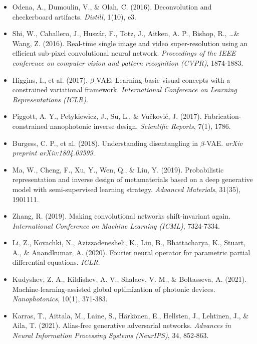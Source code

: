 \begin{itemize}
  \item[{[21]}] Odena, A., Dumoulin, V., \& Olah, C. (2016). Deconvolution and checkerboard artifacts. \textit{Distill}, 1(10), e3.
  \item[{[22]}] Shi, W., Caballero, J., Husz\'{a}r, F., Totz, J., Aitken, A. P., Bishop, R., \ldots \& Wang, Z. (2016). Real-time single image and video super-resolution using an efficient sub-pixel convolutional neural network. \textit{Proceedings of the IEEE conference on computer vision and pattern recognition (CVPR)}, 1874-1883.
  \item[{[23]}] Higgins, I., et al. (2017). $\beta$-VAE: Learning basic visual concepts with a constrained variational framework. \textit{International Conference on Learning Representations (ICLR)}.
  \item[{[24]}] Piggott, A. Y., Petykiewicz, J., Su, L., \& Vu\v{c}kovi\'{c}, J. (2017). Fabrication-constrained nanophotonic inverse design. \textit{Scientific Reports}, 7(1), 1786.
  \item[{[25]}] Burgess, C. P., et al. (2018). Understanding disentangling in $\beta$-VAE. \textit{arXiv preprint arXiv:1804.03599}.
  \item[{[26]}] Ma, W., Cheng, F., Xu, Y., Wen, Q., \& Liu, Y. (2019). Probabilistic representation and inverse design of metamaterials based on a deep generative model with semi-supervised learning strategy. \textit{Advanced Materials}, 31(35), 1901111.
  \item[{[27]}] Zhang, R. (2019). Making convolutional networks shift-invariant again. \textit{International Conference on Machine Learning (ICML)}, 7324-7334.
  \item[{[28]}] Li, Z., Kovachki, N., Azizzadenesheli, K., Liu, B., Bhattacharya, K., Stuart, A., \& Anandkumar, A. (2020). Fourier neural operator for parametric partial differential equations. \textit{ICLR}.
  \item[{[29]}] Kudyshev, Z. A., Kildishev, A. V., Shalaev, V. M., \& Boltasseva, A. (2021). Machine-learning-assisted global optimization of photonic devices. \textit{Nanophotonics}, 10(1), 371-383.
  \item[{[30]}] Karras, T., Aittala, M., Laine, S., H\"{a}rk\"{o}nen, E., Hellsten, J., Lehtinen, J., \& Aila, T. (2021). Alias-free generative adversarial networks. \textit{Advances in Neural Information Processing Systems (NeurIPS)}, 34, 852-863.
\end{itemize}

